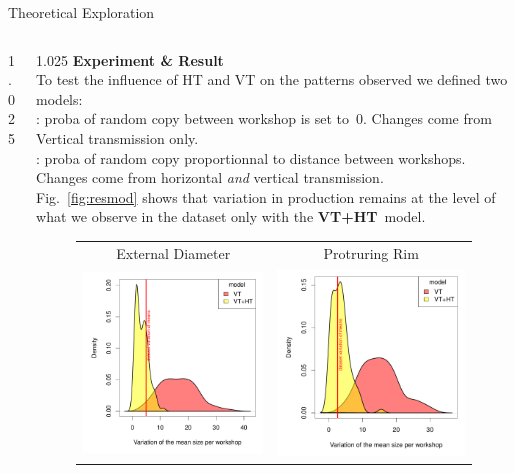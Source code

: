 \documentclass[final]{beamer}
\newlength{\onecolwid}
\newlength{\twocolwid}
\begin{document}
\begin{frame}[t]
\begin{columns}[t]
\begin{column}{\twocolwid}
\begin{block}{Theoretical Exploration}
\begin{columns}[t,totalwidth=\twocolwid]
\begin{column}{1.025\onecolwid}
\begin{center}
{    }
\end{center}
\end{column}

\begin{column}{1.025\onecolwid} %
{\textbf{Experiment \& Result}}\\
\justify
To test the influence of HT and VT on the patterns observed we defined two models:\\
: proba of random copy between workshop is set to~$0$. Changes come from Vertical transmission only.\\
: proba of random copy proportionnal to distance between workshops. Changes come from horizontal \emph{and} vertical transmission.\\
Fig.~\ref{fig:resmod} shows that variation in production remains at the level of what we observe in the dataset only with the {\footnotesize\textbf{VT+HT}}~model.
    \begin{figure}[h!]
	\begin{tabular}{cc}
	    \centering
	    \small   External Diameter & \small Protruring Rim\\
	    \includegraphics[width=0.5\linewidth]{images/ED_densities.pdf}&
	    \includegraphics[width=0.5\linewidth]{images/PR_densities.pdf}\\

\end{tabular}
\end{figure}
\end{column}
\end{columns}
\end{block}
\end{column}
\end{columns}
\end{frame}
\end{document}
